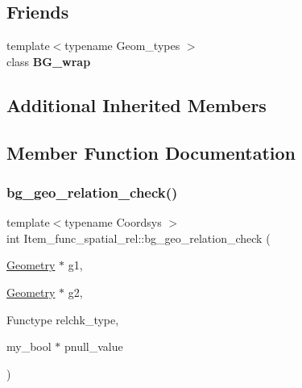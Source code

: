 \subsection*{Friends}
\begin{DoxyCompactItemize}
\item 
\mbox{\label{classItem__func__spatial__rel_a8628bcdb86412362cbea616876c86f78}} 
{\footnotesize template$<$typename Geom\+\_\+types $>$ }\\class {\bfseries B\+G\+\_\+wrap}
\end{DoxyCompactItemize}
\subsection*{Additional Inherited Members}


\subsection{Member Function Documentation}
\mbox{\label{classItem__func__spatial__rel_a498fe902a8326fa72073305c481d731e}} 
\subsubsection{\texorpdfstring{bg\+\_\+geo\+\_\+relation\+\_\+check()}{bg\_geo\_relation\_check()}}
{\footnotesize\ttfamily template$<$typename Coordsys $>$ \\
int Item\+\_\+func\+\_\+spatial\+\_\+rel\+::bg\+\_\+geo\+\_\+relation\+\_\+check (\begin{DoxyParamCaption}\item[{\mbox{\hyperlink{classGeometry}{Geometry}} $\ast$}]{g1,  }\item[{\mbox{\hyperlink{classGeometry}{Geometry}} $\ast$}]{g2,  }\item[{Functype}]{relchk\+\_\+type,  }\item[{my\+\_\+bool $\ast$}]{pnull\+\_\+value }\end{DoxyParamCaption})\hspace{0.3cm}{\ttfamily [static]}}

